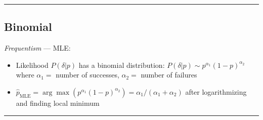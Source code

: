 {\color{black}\hrule height 0.001mm}

\subsection*{Binomial}
\emph{Frequentism} --- 
MLE:
\begin{itemize}
    \item Likelihood $P(\delta |p)$ has a binomial distribution: $P(\delta |p) \sim p^{ \alpha _1} (1-p)^{ \alpha _2}$ where $ \alpha _1 =$ number of successes, $ \alpha _2 =$ number of failures
    \item $\hat{p}_{\text{MLE}} = \arg\max (p^{ \alpha _1} (1-p)^{ \alpha _2}) =  \alpha _1 / ( \alpha _1 +  \alpha _2)$ after logarithmizing and finding local minimum
\end{itemize}

{\color{lightgray}\hrule height 0.001mm}


